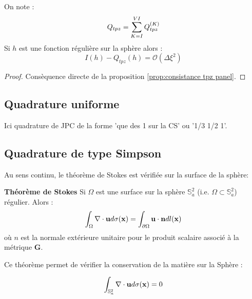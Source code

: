 \begin{proposition}
On note :
\begin{equation}
Q_{tpz}=\displaystyle\sum\limits_{K=I}^{VI} Q_{tpz}^{(K)}
\end{equation}
Si $h$ est une fonction régulière sur la sphère alors :
\begin{equation}
I(h) - Q_{tpz}(h) = \mathcal{O} \left( \Delta \xi^2 \right)
\end{equation}
\label{prop:consistance tpz}
\end{proposition}

\begin{proof}
Consèquence directe de la proposition \ref{prop:consistance tpz panel}.
\end{proof}

\subsection{Quadrature uniforme}

Ici quadrature de JPC de la forme 'que des 1 sur la CS' ou '1/3 1/2 1'.













\subsection{Quadrature de type Simpson}

Au sens continu, le théorème de Stokes est vérifiée sur la surface de la sphère:

\begin{theoreme}
\textbf{Théorème de Stokes}
Si $\Omega$ est une surface sur la sphère $\mathbb{S}_a^2$ (i.e. $\Omega \subset \mathbb{S}_a^2$) régulier. Alors :
\begin{equation}
\displaystyle\int_\Omega \nabla \cdot \mathbf{u} d \sigma (\mathbf{x}) = \displaystyle\int_{\partial \Omega} \mathbf{u} \cdot \mathbf{n} dl(\mathbf{x})
\end{equation}
où $n$ est la normale extérieure unitaire pour le produit scalaire associé à la métrique $\mathbf{G}$.
\label{th: Stokes}
\end{theoreme}

Ce théorème permet de vérifier la conservation de la matière sur la Sphère :

\begin{equation}
\displaystyle\int_{\mathbb{S}_a^2}\nabla \cdot \mathbf{u} d \sigma (\mathbf{x}) = 0
\label{eq: Stokes global}
\end{equation}


